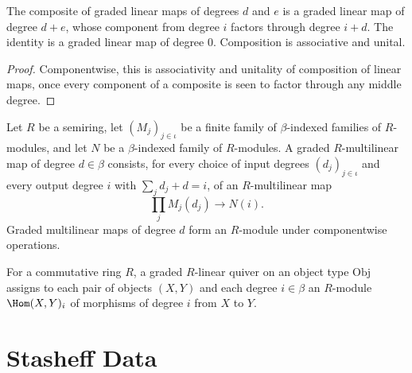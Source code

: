 \begin{lemma}
\label{AInfinityTheory.GradedLinearMap.comp}
\leanok
{}
The composite of graded linear maps of degrees $d$ and $e$ is a graded linear map
of degree $d + e$, whose component from degree $i$ factors through degree $i + d$.
The identity is a graded linear map of degree $0$. Composition is associative and
unital.
\end{lemma}
\begin{proof}
\leanok
Componentwise, this is associativity and unitality of composition of linear maps,
once every component of a composite is seen to factor through any middle degree.
\end{proof}

\begin{definition}
\label{AInfinityTheory.GradedMultilinearMap}
\leanok
Let $R$ be a semiring, let $(M_j)_{j \in \iota}$ be a finite family of
$\beta$-indexed families of $R$-modules, and let $N$ be a $\beta$-indexed family of
$R$-modules. A graded $R$-multilinear map of degree $d \in \beta$ consists, for every
choice of input degrees $(d_j)_{j \in \iota}$ and every output degree $i$ with
$\sum_j d_j + d = i$, of an $R$-multilinear map
\[
  \prod_j M_j(d_j) \to N(i).
\]
Graded multilinear maps of degree $d$ form an $R$-module under componentwise
operations.
\end{definition}

\begin{definition}
\label{AInfinityTheory.GradedLinearQuiver}
\leanok
For a commutative ring $R$, a graded $R$-linear quiver on an object type
$\mathrm{Obj}$ assigns to each pair of objects $(X,Y)$ and each degree $i \in \beta$
an $R$-module $\Hom(X,Y)_i$ of morphisms of degree $i$ from $X$ to $Y$.
\end{definition}



\chapter{Stasheff Data}

